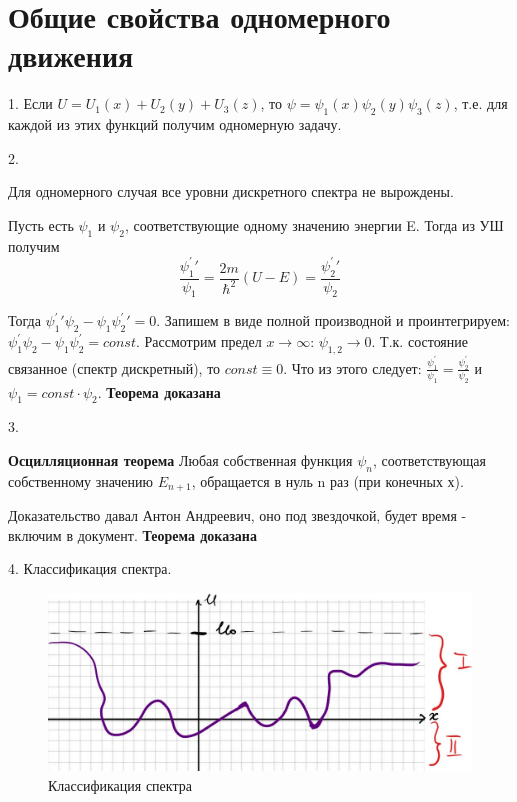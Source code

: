\newpage
\chapter{Общие свойства одномерного движения}
\par 1\textdegree. Если $U=U_1(x)+U_2(y)+U_3(z)$, то $\psi=\psi_1(x)\psi_2(y)\psi_3(z)$, т.е. для каждой из этих функций получим одномерную задачу.
\par 2\textdegree. \begin{theorem} Для одномерного случая все уровни дискретного спектра не вырождены.
\end{theorem}
\par \proof Пусть есть $\psi_1$ и $\psi_2$, соответствующие одному значению энергии E. Тогда из УШ получим
$$\frac{\psi_1^\prime\prime}{\psi_1} = \frac{2m}{\hbar^2}(U-E)=\frac{\psi_2^\prime\prime}{\psi_2}$$
\par Тогда $ \psi_1^\prime\prime\psi_2 - \psi_1 \psi_2^\prime\prime=0$. Запишем в виде полной производной и проинтегрируем: $\psi_1^\prime\psi_2 - \psi_1 \psi_2^\prime=const$. Рассмотрим предел $x \rightarrow \infty$: $\psi_{1,2} \rightarrow 0$. Т.к. состояние связанное (спектр дискретный), то $const \equiv 0$. Что из этого следует: $ \frac{\psi_1^\prime}{\psi_1} = \frac{\psi_2^\prime}{\psi_2}$ и $\psi_1 = const \cdot \psi_2 $.
\textbf{Теорема доказана}
\par 3\textdegree.\begin{theorem} \textbf{Осцилляционная теорема} Любая собственная функция $\psi_n$, соответствующая собственному значению $E_{n+1}$, обращается в нуль n раз (при конечных х).\end{theorem}
\par \proof \par Доказательство давал Антон Андреевич, оно под звездочкой, будет время - включим в документ. \textbf{Теорема доказана}
\par 4\textdegree. Классификация спектра.
\par \begin{figure} 
\vspace{-2ex}
\includegraphics[width=1\linewidth]{pictures/20.1.jpg}
\caption{Классификация спектра}
\end{figure}
